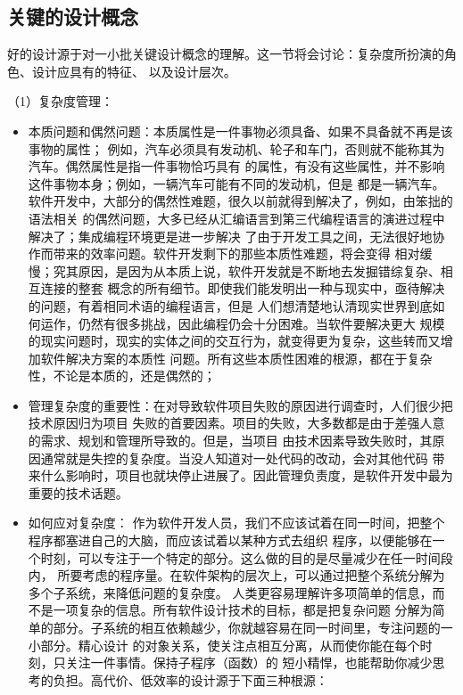 \documentclass{article}
\begin{document}
\subsection{关键的设计概念}
好的设计源于对一小批关键设计概念的理解。这一节将会讨论：复杂度所扮演的角色、设计应具有的特征、
以及设计层次。
\par
（1）复杂度管理：
\par
\begin{itemize}
    \item 本质问题和偶然问题：本质属性是一件事物必须具备、如果不具备就不再是该事物的属性；
    例如，汽车必须具有发动机、轮子和车门，否则就不能称其为汽车。偶然属性是指一件事物恰巧具有
    的属性，有没有这些属性，并不影响这件事物本身；例如，一辆汽车可能有不同的发动机，但是
    都是一辆汽车。软件开发中，大部分的偶然性难题，很久以前就得到解决了，例如，由笨拙的语法相关
    的偶然问题，大多已经从汇编语言到第三代编程语言的演进过程中解决了；集成编程环境更是进一步解决
    了由于开发工具之间，无法很好地协作而带来的效率问题。软件开发剩下的那些本质性难题，将会变得
    相对缓慢；究其原因，是因为从本质上说，软件开发就是不断地去发掘错综复杂、相互连接的整套
    概念的所有细节。即使我们能发明出一种与现实中，亟待解决的问题，有着相同术语的编程语言，但是
    人们想清楚地认清现实世界到底如何运作，仍然有很多挑战，因此编程仍会十分困难。当软件要解决更大
    规模的现实问题时，现实的实体之间的交互行为，就变得更为复杂，这些转而又增加软件解决方案的本质性
    问题。所有这些本质性困难的根源，都在于复杂性，不论是本质的，还是偶然的；
    \item 管理复杂度的重要性：在对导致软件项目失败的原因进行调查时，人们很少把技术原因归为项目
    失败的首要因素。项目的失败，大多数都是由于差强人意的需求、规划和管理所导致的。但是，当项目
    由技术因素导致失败时，其原因通常就是失控的复杂度。当没人知道对一处代码的改动，会对其他代码
    带来什么影响时，项目也就块停止进展了。因此管理负责度，是软件开发中最为重要的技术话题。
    \item 如何应对复杂度：
    作为软件开发人员，我们不应该试着在同一时间，把整个程序都塞进自己的大脑，而应该试着以某种方式去组织
    程序，以便能够在一个时刻，可以专注于一个特定的部分。这么做的目的是尽量减少在任一时间段内，
    所要考虑的程序量。在软件架构的层次上，可以通过把整个系统分解为多个子系统，来降低问题的复杂度。
    人类更容易理解许多项简单的信息，而不是一项复杂的信息。所有软件设计技术的目标，都是把复杂问题
    分解为简单的部分。子系统的相互依赖越少，你就越容易在同一时间里，专注问题的一小部分。精心设计
    的对象关系，使关注点相互分离，从而使你能在每个时刻，只关注一件事情。保持子程序（函数）的
    短小精悍，也能帮助你减少思考的负担。高代价、低效率的设计源于下面三种根源：

\end{itemize}
\end{document}
